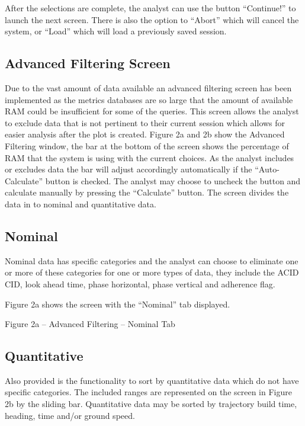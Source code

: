 \documentclass[]{article}
\begin{document}
After the selections are complete, the analyst can use the button “Continue!” to launch the next screen.  There is also the option to “Abort” which will cancel the system, or “Load” which will load a previously saved session.

\subsection{Advanced Filtering Screen}
\label{advancedFilteringScreen}
Due to the vast amount of data available an advanced filtering screen has been implemented as the metrics databases are so large that the amount of available RAM could be insufficient for some of the queries.  This screen allows the analyst to exclude data that is not pertinent to their current session which allows for easier analysis after the plot is created. Figure 2a and 2b show the Advanced Filtering window, the bar at the bottom of the screen shows the percentage of RAM that the system is using with the current choices.  As the analyst includes or excludes data the bar will adjust accordingly automatically if the “Auto-Calculate” button is checked.  The analyst may choose to uncheck the button and calculate manually by pressing the “Calculate” button. The screen divides the data in to nominal and quantitative data.

\subsection{Nominal}
\label{nominal}
Nominal data has specific categories and the analyst can choose to eliminate one or more of these categories for one or more types of data, they include the ACID CID, look ahead time, phase horizontal, phase vertical and adherence flag.

Figure 2a shows the screen with the “Nominal” tab displayed.



Figure 2a – Advanced Filtering – Nominal Tab


\subsection{Quantitative}
\label{quantitative}
Also provided is the functionality to sort by quantitative data which do not have specific categories. The included ranges are represented on the screen in Figure 2b by the sliding bar. Quantitative data may be sorted by trajectory build time, heading, time and/or ground speed.
\end{document}
